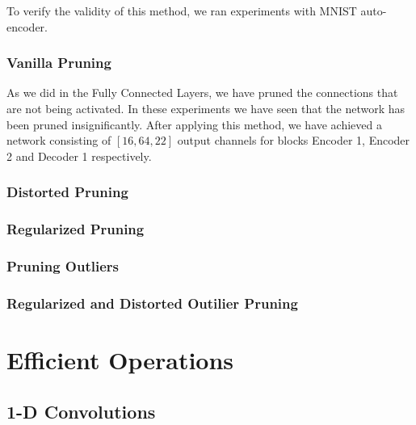 To verify the validity of this method, we ran experiments with MNIST auto-encoder.
\subsubsection{Vanilla Pruning}
As we did in the Fully Connected Layers, we have pruned the connections that are not being activated. In these experiments we have seen that the network has been pruned insignificantly. After applying this method, we have achieved a network consisting of $[16, 64, 22]$ output channels for blocks Encoder 1, Encoder 2 and Decoder 1 respectively.

\subsubsection{Distorted Pruning}

\subsubsection{Regularized Pruning}

\subsubsection{Pruning Outliers}

\subsubsection{Regularized and Distorted Outilier Pruning}

\section{Efficient Operations}
\subsection{1-D Convolutions}

